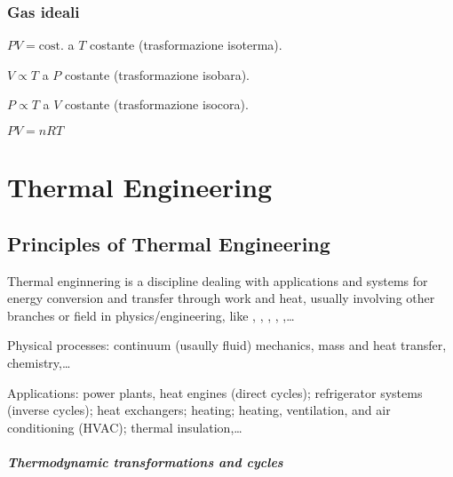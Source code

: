 \documentclass[letterpaper,10pt,english]{jupyterBook}
\begin{document}
\section{Gas ideali}
\label{\detokenize{ch/ideal_gases:gas-ideali}}\label{\detokenize{ch/ideal_gases:classical-thermodynamics-ideal-gases}}\label{\detokenize{ch/ideal_gases::doc}}
\sphinxAtStartPar
{} \(P V = \text{cost.}\) a \(T\) costante (trasformazione isoterma).

\sphinxAtStartPar
{} \(V \propto T\) a \(P\) costante (trasformazione isobara).

\sphinxAtStartPar
{} \(P \propto T\) a \(V\) costante (trasformazione isocora).

\sphinxAtStartPar
{} \(P V = n R T\)

\sphinxstepscope


\part{Thermal Engineering}

\sphinxstepscope


\chapter{Principles of Thermal Engineering}
\label{\detokenize{ch/thermal-engineering:principles-of-thermal-engineering}}\label{\detokenize{ch/thermal-engineering:thermal-engineering-intro}}\label{\detokenize{ch/thermal-engineering::doc}}
\sphinxAtStartPar
Thermal enginnering is a discipline dealing with applications and systems for energy conversion and transfer through work and heat, usually involving other branches or field in physics/engineering, like , , , , ,…

\sphinxAtStartPar
Physical processes: continuum (usaully fluid) mechanics, mass and heat transfer, chemistry,…

\sphinxAtStartPar
Applications: power plants, heat engines (direct cycles); refrigerator systems (inverse cycles); heat exchangers; heating; heating, ventilation, and air conditioning (HVAC); thermal insulation,…
\subsubsection*{Thermodynamic transformations and cycles}
\end{document}
